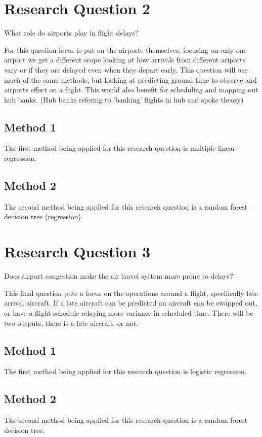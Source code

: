 \documentclass[a4paper,12pt]{article}
\begin{document}
\section{Research Question 2}
What role do airports play in flight delays?

For this question focus is put on the airports themselves, focusing on only one airport we get a different scope looking at how arrivals from different ariports vary
or if they are delayed even when they depart early. This question will use much of the same methods, but looking at predicting ground time to observe and airports effect on a flight.
This would also benefit for scheduling and mapping out hub banks. (Hub banks refering to 'banking' flights in hub and spoke theory)

\subsection{Method 1}
The first method being applied for this research question is multiple linear regression.

\subsection{Method 2}
The second method being applied for this research question is a random forest decision tree (regression).


\section{Research Question 3}
Does airport congestion make the air travel system more prone to delays?

This final question puts a focus on the operations around a flight, specifically late arrival aircraft. If a late aircraft can be predicted an aircraft can be swapped out,
or have a flight schedule relaying more variance in scheduled time. There will be two outputs, there is a late aircraft, or not.

\subsection{Method 1}
The first method being applied for this research question is logistic regression.

\subsection{Method 2}
The second method being applied for this research question is a random forest decision tree.
\end{document}
